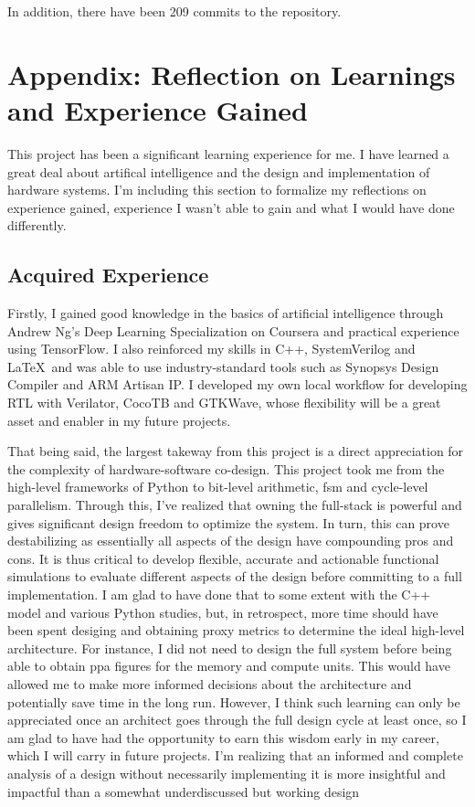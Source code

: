 In addition, there have been 209 commits to the repository.

\newpage
\section{Appendix: Reflection on Learnings and Experience Gained}
This project has been a significant learning experience for me. I have learned a great deal about artifical intelligence and the design and implementation of hardware systems. I'm including this
section to formalize my reflections on experience gained, experience I wasn't able to gain and what I would have done differently.

\subsection{Acquired Experience}
Firstly, I gained good knowledge in the basics of artificial intelligence through Andrew Ng's Deep Learning Specialization on Coursera and practical experience using TensorFlow. I also reinforced
my skills in C++, SystemVerilog and \LaTeX\ and was able to use industry-standard tools such as Synopsys Design Compiler and ARM Artisan IP. I developed my own local workflow for developing RTL
with Verilator, CocoTB and GTKWave, whose flexibility will be a great asset and enabler in my future projects.

That being said, the largest takeway from this project is a direct appreciation for the complexity of hardware-software co-design. This project took me from the high-level frameworks of Python
to bit-level arithmetic, \ac{fsm} and cycle-level parallelism. Through this, I've realized that owning the full-stack is powerful and gives significant design freedom to optimize the system. In
turn, this can prove destabilizing as essentially all aspects of the design have compounding pros and cons. It is thus critical to develop flexible, accurate and actionable functional simulations
to evaluate different aspects of the design before committing to a full implementation. I am glad to have done that to some extent with the C++ model and various Python studies, but, in retrospect,
more time should have been spent desiging and obtaining proxy metrics to determine the ideal high-level architecture. For instance, I did not need to design the full system before being able to
obtain \ac{ppa} figures for the memory and compute units. This would have allowed me to make more informed decisions about the architecture and potentially save time in the long run. However, I
think such learning can only be appreciated once an architect goes through the full design cycle at least once, so I am glad to have had the opportunity to earn this wisdom early in my career,
which I will carry in future projects. I'm realizing that an informed and complete analysis of a design without necessarily implementing it is more insightful and impactful than a somewhat
underdiscussed but working design

